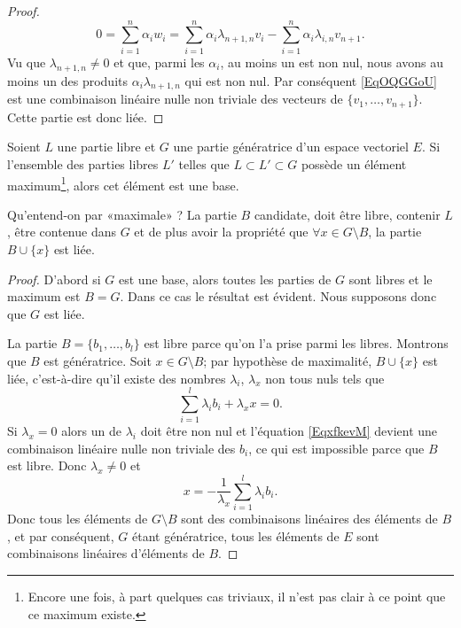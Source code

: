 \begin{proof}
	\begin{equation}        \label{EqOQGGoU}
		0=\sum_{i=1}^n\alpha_iw_i=\sum_{i=1}^n\alpha_i\lambda_{n+1,n}v_i - \sum_{i=1}^n\alpha_i\lambda_{i,n} v_{n+1}.
	\end{equation}
	Vu que \( \lambda_{n+1,n}\neq 0\) et que, parmi les \( \alpha_i\), au moins un est non nul, nous avons au moins un des produits \( \alpha_i\lambda_{n+1,n}\) qui est non nul. Par conséquent \eqref{EqOQGGoU} est une combinaison linéaire nulle non triviale des vecteurs de \( \{ v_1,\ldots, v_{n+1} \}\). Cette partie est donc liée.
\end{proof}

\begin{lemma}   \label{LemkUfzHl}
	Soient \( L\) une partie libre et \( G\) une partie génératrice d'un espace vectoriel \( E\). Si l'ensemble des parties libres \( L'\) telles que \( L\subset L'\subset G\) possède un élément maximum\footnote{Encore une fois, à part quelques cas triviaux, il n'est pas clair à ce point que ce maximum existe.}, alors cet élément est une base.
\end{lemma}
Qu'entend-on par «maximale» ? La partie \( B\) candidate, doit être libre, contenir \( L\), être contenue dans \( G\) et de plus avoir la propriété que \( \forall x\in G\setminus B\), la partie \( B\cup\{ x \}\) est liée.

\begin{proof}
	D'abord si \( G\) est une base, alors toutes les parties de \( G\) sont libres et le maximum est \( B=G\). Dans ce cas le résultat est évident. Nous supposons donc que \( G\) est liée.

	La partie \( B=\{ b_1,\ldots, b_l \}\) est libre parce qu'on l'a prise parmi les libres. Montrons que \( B\) est génératrice. Soit \( x\in G\setminus B\); par hypothèse de maximalité, \( B\cup\{ x \}\) est liée, c'est-à-dire qu'il existe des nombres \( \lambda_i\), \( \lambda_x\) non tous nuls tels que
	\begin{equation}    \label{EqxfkevM}
		\sum_{i=1}^l\lambda_ib_i+\lambda_xx=0.
	\end{equation}
	Si \( \lambda_x=0\) alors un de \( \lambda_i\) doit être non nul et l'équation \eqref{EqxfkevM} devient une combinaison linéaire nulle non triviale des \( b_i\), ce qui est impossible parce que \( B\) est libre. Donc \( \lambda_x\neq 0\) et
	\begin{equation}
		x=-\frac{1}{ \lambda_x }\sum_{i=1}^l\lambda_ib_i.
	\end{equation}
	Donc tous les éléments de \( G\setminus B\) sont des combinaisons linéaires des éléments de \( B\), et par conséquent, \( G\) étant génératrice, tous les éléments de \( E\) sont combinaisons linéaires d'éléments de \( B\).
\end{proof}

